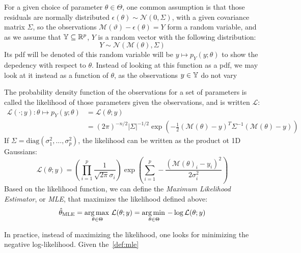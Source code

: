 \documentclass[../../Main_ManuscritThese.tex]{subfiles}
\begin{document}
For a given choice of parameter $\theta\in\Theta$, one common assumption is that those residuals are normally distributed $\epsilon(\theta) \sim \mathcal{N}(0, \Sigma)$, with a given covariance matrix $\Sigma$, so the observations $\mathscr{M}(\vartheta) - \epsilon(\theta)=Y$ form a random variable, and as we assume that $\mathbb{Y} \subseteq \mathbb{R}^p$, $Y$ is a random vector with the following distribution:
\begin{equation}
  \label{eq:lik_gaussian}
  Y  \sim \mathcal{N}(\mathcal{M}(\theta), \Sigma)
\end{equation}
Its pdf will be denoted of this random variable will be  $y \mapsto p_Y(y;\theta)$ to show the depedency with respect to $\theta$. Instead of looking at this function as a pdf, we may look at it instead as a function of $\theta$, as the observations $y\in\mathbb{Y}$ do not vary
\begin{definition}
  \label{def:mle}
  The probability density function of the observations for a set of parameters is called the likelihood of those parameters given the observations, and is written $\mathcal{L}$:
  \begin{align}
    \label{eq:likelihood_definition}
    \mathcal{L}(\cdot ;y): \theta \mapsto p_{Y}(y;\theta) &= \mathcal{L}(\theta;y) \\
    &=(2\pi)^{-n/2}\lvert \Sigma \rvert^{-1/2}\exp\left(-\frac{1}{2}(\mathcal{M}(\theta) - y)^T\Sigma^{-1}(\mathcal{M}(\theta) - y)\right)
  \end{align}
  If $\Sigma = \mathrm{diag}(\sigma^2_1,\dots, \sigma^2_p)$, the likelihood can be written as the product ot 1D Gaussians:
  \begin{equation}
    \mathcal{L}(\theta;y) = \left(\prod_{i=1}^p\frac{1}{\sqrt{2\pi}\sigma_i}\right)\exp\left(\sum_{i=1}^p -\frac{(\mathcal{M}(\theta)_i - y_i)^2}{2\sigma^2_i}\right)
  \end{equation}
  Based on the likelihood function, we can define the \emph{Maximum Likelihood Estimator}, or \emph{MLE}, that maximizes the likelihood defined above:
  \begin{equation}
    \label{eq:def_MLE}
    \hat{\theta}_{\mathrm{MLE}} = \operatorname*{arg\,max \,}_{\theta\in\Theta}\mathcal{L}(\theta;y) = \operatorname*{arg\,min \,}_{\theta \in \Theta} -\log \mathcal{L}(\theta;y)
  \end{equation}

\end{definition}
  In practice, instead of maximizing the likelihood, one looks for minimizing the negative log-likelihood. Given the~\cref{def:mle}
\end{document}
